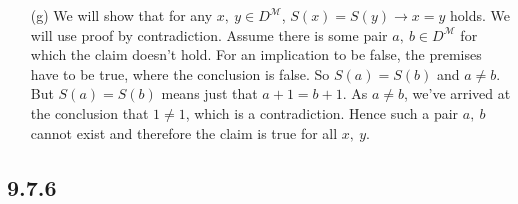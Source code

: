 \begin{enumerate}
    \item[(g)] %
    We will show that for any $x,\ y \in D^\mathcal{M}$, $S(x) = S(y)
    \rightarrow x = y$ holds. We will use proof by
    contradiction. Assume there is some pair $a,\ b \in D^\mathcal{M}$
    for which the claim doesn't hold. For an implication to be false,
    the premises have to be true, where the conclusion is false. So
    $S(a) = S(b)$ and $ a \neq b$. But $S(a) = S(b)$ means just that
    $a + 1 = b + 1$. As $a \neq b$, we've arrived at the conclusion
    that $1 \neq 1$, which is a contradiction. Hence such a pair $a,\
    b$ cannot exist and therefore the claim is true for all $x,\ y$.
\end{enumerate}
\subsection*{9.7.6}

